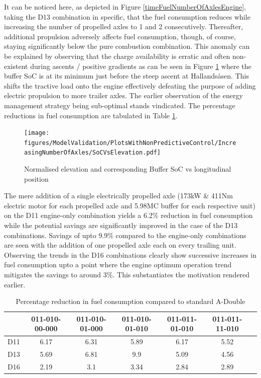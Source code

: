 \documentclass[ExampleMasters.tex]{subfiles}
\begin{document}
It can be noticed here, as depicted in Figure \ref{timeFuelNumberOfAxlesEngine}, taking the D13 combination in specific, that the fuel consumption reduces while increasing the number of propelled axles to 1 and 2 consecutively. Thereafter, additional propulsion adversely affects fuel consumption, though, of course, staying significantly below the pure combustion combination. This anomaly can be explained by observing that the charge availability is erratic and often non-existent during ascents / positive gradients as can be seen in Figure \ref{SoCVsPosition} where the buffer SoC is at its minimum just before the steep ascent at Hallands\aa sen. This shifts the tractive load onto the engine effectively defeating the purpose of adding electric propulsion to more trailer axles. The earlier observation of the energy management strategy being sub-optimal stands vindicated. The percentage reductions in fuel consumption are tabulated in Table \ref{table:fuelConsumptionReductionAxles}.
\begin{figure}
\texttt{[image: figures/ModelValidation/PlotsWithNonPredictiveControl/IncreasingNumberOfAxles/SoCVsElevation.pdf]}
\caption{Normalised elevation and corresponding Buffer SoC vs longitudinal position}
\label{SoCVsPosition}
\end{figure}
The mere addition of a single electrically propelled axle (173kW \& 411Nm electric motor for each propelled axle and 5.98MC buffer for each respective unit) on the D11 engine-only combination yields a 6.2\% reduction in fuel consumption while the potential savings are significantly improved in the case of the D13 combinations. Savings of upto 9.9\% compared to the engine-only combinations are seen with the addition of one propelled axle each on every trailing unit. Observing the trends in the D16 combinations clearly show successive increases in fuel consumption upto a point where the engine optimum operation trend mitigates the savings to around 3\%. This substantiates the motivation rendered earlier.
\begin{table}
\centering
\begin{tabular}{|c|c|c|c|c|c|c|}
\hline
& 011-010-00-000 & 011-010-01-000 & 011-010-01-010 & 011-011-01-010 & 011-011-11-010 \\
\hline
D11 & 6.17 & 6.31 & 5.89 & 6.17 & 5.52 \\
\hline
D13 & 5.69 & 6.81 & 9.9 & 5.09 & 4.56 \\
\hline
D16 & 2.19 & 3.1 & 3.34 & 2.84 & 2.89 \\
\hline
\end{tabular}
\caption{Percentage reduction in fuel consumption compared to standard A-Double}
\label{table:fuelConsumptionReductionAxles}
\end{table}
\end{document}
